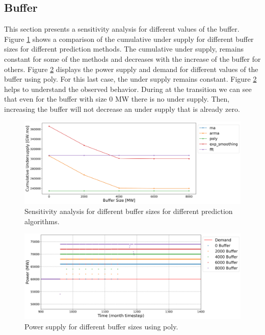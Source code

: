 \documentclass[11pt]{article}
\begin{document}
\subsection{Buffer}

This section presents a sensitivity analysis for different values of the buffer. Figure \ref{fig:23-buff} shows a comparison of the cumulative under supply for different buffer sizes for different prediction methods. The cumulative under supply, remains constant for some of the methods and decreases with the increase of the buffer for others. Figure \ref{fig:23-buf-poly} displays the power supply and demand for different values of the buffer using poly. For this last case, the under supply remains constant. Figure \ref{fig:23-buf-poly} helps to understand the observed behavior. During at the transition we can see that even for the buffer with size 0 MW there is no under supply. Then, increasing the buffer will not decrease an under supply that is already zero.

\begin{figure}[H]
	\centering
	\includegraphics[width=\textwidth]{23-figures/23-sens-buffer.png} 
	\hfill
	\caption{Sensitivity analysis for different buffer sizes for different prediction algorithms.}
	\label{fig:23-buff}
\end{figure}

\begin{figure}[H]
	\centering
	\includegraphics[width=\textwidth]{23-figures/23-power-buffer-poly.png} 
	\hfill
	\caption{Power supply for different buffer sizes using poly.}
	\label{fig:23-buf-poly}
\end{figure}
\end{document}
